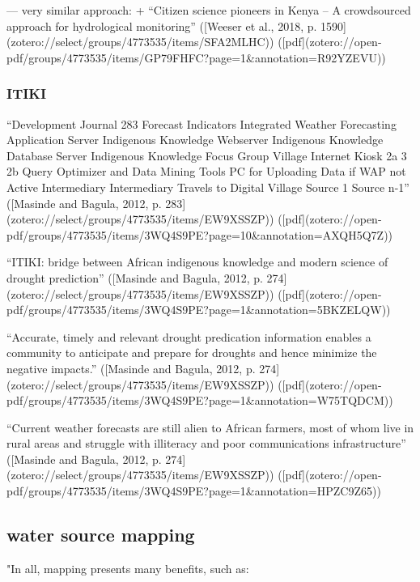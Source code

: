 {---
very similar approach:
+ “Citizen science pioneers in Kenya – A crowdsourced approach for hydrological monitoring” ([Weeser et al., 2018, p. 1590](zotero://select/groups/4773535/items/SFA2MLHC)) ([pdf](zotero://open-pdf/groups/4773535/items/GP79FHFC?page=1&annotation=R92YZEVU))

\subsubsection{ITIKI}
“Development Journal 283 Forecast Indicators Integrated Weather Forecasting Application Server Indigenous Knowledge Webserver Indigenous Knowledge Database Server Indigenous Knowledge Focus Group Village Internet Kiosk 2a 3 2b Query Optimizer and Data Mining Tools PC for Uploading Data if WAP not Active Intermediary Intermediary Travels to Digital Village Source 1 Source n-1” ([Masinde and Bagula, 2012, p. 283](zotero://select/groups/4773535/items/EW9XSSZP)) ([pdf](zotero://open-pdf/groups/4773535/items/3WQ4S9PE?page=10&annotation=AXQH5Q7Z))

“ITIKI: bridge between African indigenous knowledge and modern science of drought prediction” ([Masinde and Bagula, 2012, p. 274](zotero://select/groups/4773535/items/EW9XSSZP)) ([pdf](zotero://open-pdf/groups/4773535/items/3WQ4S9PE?page=1&annotation=5BKZELQW))

“Accurate, timely and relevant drought predication information enables a community to anticipate and prepare for droughts and hence minimize the negative impacts.” ([Masinde and Bagula, 2012, p. 274](zotero://select/groups/4773535/items/EW9XSSZP)) ([pdf](zotero://open-pdf/groups/4773535/items/3WQ4S9PE?page=1&annotation=W75TQDCM))

“Current weather forecasts are still alien to African farmers, most of whom live in rural areas and struggle with illiteracy and poor communications infrastructure” ([Masinde and Bagula, 2012, p. 274](zotero://select/groups/4773535/items/EW9XSSZP)) ([pdf](zotero://open-pdf/groups/4773535/items/3WQ4S9PE?page=1&annotation=HPZC9Z65))


\subsection{water source mapping}
"In all, mapping presents many benefits, such as:

}
